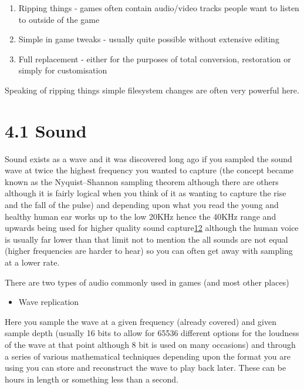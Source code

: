 \documentclass[
]{book}
\providecommand{\tightlist}{%
  \setlength{\itemsep}{0pt}\setlength{\parskip}{0pt}}
\begin{document}
\begin{enumerate}
\def\labelenumi{\arabic{enumi}.}
\tightlist
\item
  Ripping things - games often contain audio/video tracks people want to listen to outside of the game
\item
  Simple in game tweaks - usually quite possible without extensive editing
\item
  Full replacement - either for the purposes of total conversion, restoration or simply for customisation
\end{enumerate}

Speaking of ripping things simple filesystem changes are often very powerful here.

\hypertarget{sound}{%
\section{4.1 Sound}\label{sound}}

Sound exists as a wave and it was discovered long ago if you sampled the sound wave at twice the highest frequency you wanted to capture (the concept became known as the Nyquist--Shannon sampling theorem although there are others although it is fairly logical when you think of it as wanting to capture the rise and the fall of the pulse) and depending upon what you read the young and healthy human ear works up to the low 20KHz hence the 40KHz range and upwards being used for higher quality sound capture\href{romhacking202013.html\#fn12x0}{12} although the human voice is usually far lower than that limit not to mention the all sounds are not equal (higher frequencies are harder to hear) so you can often get away with sampling at a lower rate.

There are two types of audio commonly used in games (and most other places)

\begin{itemize}
\tightlist
\item
  Wave replication
\end{itemize}

Here you sample the wave at a given frequency (already covered) and given sample depth (usually 16 bits to allow for 65536 different options for the loudness of the wave at that point although 8 bit is used on many occasions) and through a series of various mathematical techniques depending upon the format you are using you can store and reconstruct the wave to play back later. These can be hours in length or something less than a second.
\end{document}
